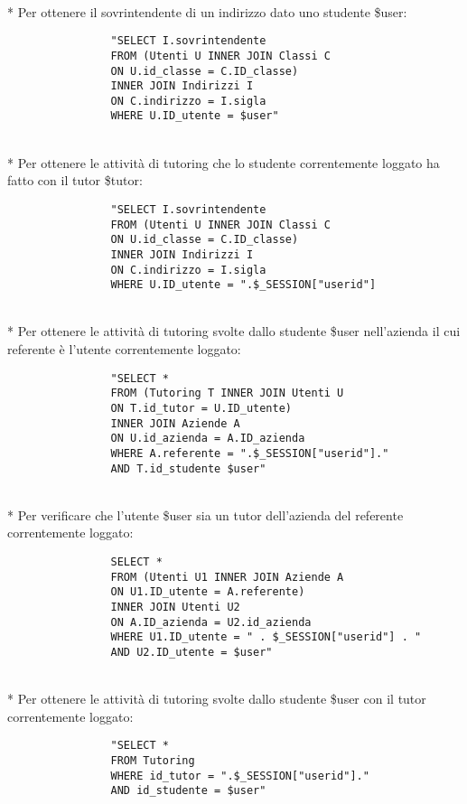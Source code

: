 \documentclass[12pt]{article}
\begin{document}
\\*
\noindent
Per ottenere il sovrintendente di un indirizzo dato uno studente \$user:
\begin{verbatim}
                "SELECT I.sovrintendente
                FROM (Utenti U INNER JOIN Classi C 
                ON U.id_classe = C.ID_classe)
                INNER JOIN Indirizzi I
                ON C.indirizzo = I.sigla
                WHERE U.ID_utente = $user"
\end{verbatim}

\\*
\noindent
Per ottenere le attività di tutoring che lo studente correntemente loggato ha fatto con il tutor \$tutor:
\begin{verbatim}
                "SELECT I.sovrintendente
                FROM (Utenti U INNER JOIN Classi C 
                ON U.id_classe = C.ID_classe)
                INNER JOIN Indirizzi I
                ON C.indirizzo = I.sigla
                WHERE U.ID_utente = ".$_SESSION["userid"]
\end{verbatim}

\\*
\noindent
Per ottenere le attività di tutoring svolte dallo studente \$user nell'azienda il cui referente è l'utente correntemente loggato:
\begin{verbatim}
                "SELECT *
                FROM (Tutoring T INNER JOIN Utenti U
                ON T.id_tutor = U.ID_utente)
                INNER JOIN Aziende A
                ON U.id_azienda = A.ID_azienda
                WHERE A.referente = ".$_SESSION["userid"]." 
                AND T.id_studente $user"
\end{verbatim}

\\*
\noindent
Per verificare che l'utente \$user sia un tutor dell'azienda del referente correntemente loggato:
\begin{verbatim} 
                SELECT *
                FROM (Utenti U1 INNER JOIN Aziende A
                ON U1.ID_utente = A.referente)
                INNER JOIN Utenti U2
                ON A.ID_azienda = U2.id_azienda
                WHERE U1.ID_utente = " . $_SESSION["userid"] . " 
                AND U2.ID_utente = $user"
\end{verbatim}

\\*
\noindent
Per ottenere le attività di tutoring svolte dallo studente \$user con il tutor correntemente loggato:
\begin{verbatim}
                "SELECT *
                FROM Tutoring 
                WHERE id_tutor = ".$_SESSION["userid"]." 
                AND id_studente = $user"
\end{verbatim}
\end{document}
